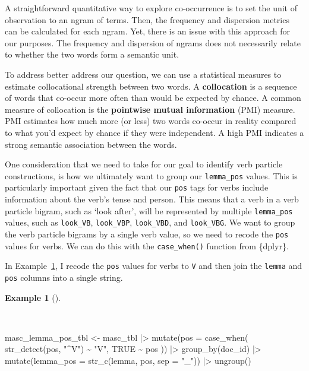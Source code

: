 \documentclass[
  letterpaper,
  krantz1]{latex/krantz-mod}
\newenvironment{Shaded}{\begin{snugshade}}{\end{snugshade}}
\newcommand{\AttributeTok}[1]{\textcolor[rgb]{0.00,0.00,0.00}{#1}}
\newcommand{\ConstantTok}[1]{\textcolor[rgb]{0.00,0.00,0.00}{#1}}
\newcommand{\FunctionTok}[1]{\textcolor[rgb]{0.00,0.00,0.00}{#1}}
\newcommand{\NormalTok}[1]{\textcolor[rgb]{0.00,0.00,0.00}{#1}}
\newcommand{\OtherTok}[1]{\textcolor[rgb]{0.00,0.00,0.00}{#1}}
\newcommand{\SpecialCharTok}[1]{\textcolor[rgb]{0.00,0.00,0.00}{#1}}
\newcommand{\StringTok}[1]{\textcolor[rgb]{0.00,0.00,0.00}{#1}}
\theoremstyle{definition}
\newtheorem{example}{Example}[chapter]
\theoremstyle{definition}
\theoremstyle{remark}
\begin{document}
A straightforward quantitative way to explore co-occurrence is to set
the unit of observation to an ngram of terms. Then, the frequency and
dispersion metrics can be calculated for each ngram. Yet, there is an
issue with this approach for our purposes. The frequency and dispersion
of ngrams does not necessarily relate to whether the two words form a
semantic unit.

To address better address our question, we can use a statistical
measures to estimate collocational strength between two words. A
\textbf{collocation} is a sequence of words that co-occur more often
than would be expected by chance. A common measure of collocation is the
\textbf{pointwise mutual information} (PMI) measure. PMI estimates how
much more (or less) two words co-occur in reality compared to what you'd
expect by chance if they were independent. A high PMI indicates a strong
semantic association between the words.

One consideration that we need to take for our goal to identify verb
particle constructions, is how we ultimately want to group our
\texttt{lemma\_pos} values. This is particularly important given the
fact that our \texttt{pos} tags for verbs include information about the
verb's tense and person. This means that a verb in a verb particle
bigram, such as `look after', will be represented by multiple
\texttt{lemma\_pos} values, such as \texttt{look\_VB},
\texttt{look\_VBP}, \texttt{look\_VBD}, and \texttt{look\_VBG}. We want
to group the verb particle bigrams by a single verb value, so we need to
recode the \texttt{pos} values for verbs. We can do this with the
\texttt{case\_when()} function from \{dplyr\}.

In Example~\ref{exm-explore-masc-lemma-pos}, I recode the \texttt{pos}
values for verbs to \texttt{V} and then join the \texttt{lemma} and
\texttt{pos} columns into a single string.

\begin{example}[]\protect\hypertarget{exm-explore-masc-lemma-pos}{}\label{exm-explore-masc-lemma-pos}

~

\begin{Shaded}
\begin{Highlighting}[numbers=left,,]
\NormalTok{masc\_lemma\_pos\_tbl }\OtherTok{\textless{}{-}}
\NormalTok{  masc\_tbl }\SpecialCharTok{|\textgreater{}}
  \FunctionTok{mutate}\NormalTok{(}\AttributeTok{pos =} \FunctionTok{case\_when}\NormalTok{(}
    \FunctionTok{str\_detect}\NormalTok{(pos, }\StringTok{"\^{}V"}\NormalTok{) }\SpecialCharTok{\textasciitilde{}} \StringTok{"V"}\NormalTok{,}
    \ConstantTok{TRUE} \SpecialCharTok{\textasciitilde{}}\NormalTok{ pos}
\NormalTok{  )) }\SpecialCharTok{|\textgreater{}}
  \FunctionTok{group\_by}\NormalTok{(doc\_id) }\SpecialCharTok{|\textgreater{}}
  \FunctionTok{mutate}\NormalTok{(}\AttributeTok{lemma\_pos =} \FunctionTok{str\_c}\NormalTok{(lemma, pos, }\AttributeTok{sep =} \StringTok{"\_"}\NormalTok{)) }\SpecialCharTok{|\textgreater{}}
  \FunctionTok{ungroup}\NormalTok{()}
\end{Highlighting}
\end{Shaded}

\end{example}
\end{document}
